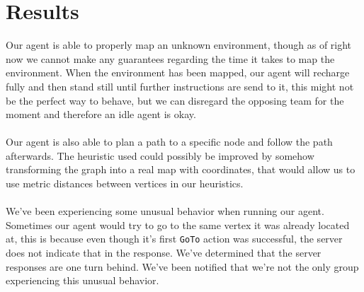 \documentclass[11pt]{report}
\begin{document}
\section*{Results}
Our agent is able to properly map an unknown environment, though as of right now we cannot make any guarantees regarding the time it takes to map the environment. When the environment has been mapped, our agent will recharge fully and then stand still until further instructions are send to it, this might not be the perfect way to behave, but we can disregard the opposing team for the moment and therefore an idle agent is okay.\\
\\
Our agent is also able to plan a path to a specific node and follow the path afterwards. The heuristic used could possibly be improved by somehow transforming the graph into a real map with coordinates, that would allow us to use metric distances between vertices in our heuristics.\\
\\
We've been experiencing some unusual behavior when running our agent. Sometimes our agent would try to go to the same vertex it was already located at, this is because even though it's first {\tt GoTo} action was successful, the server does not indicate that in the response. We've determined that the server responses are one turn behind. We've been notified that we're not the only group experiencing this unusual behavior.
\end{document}
